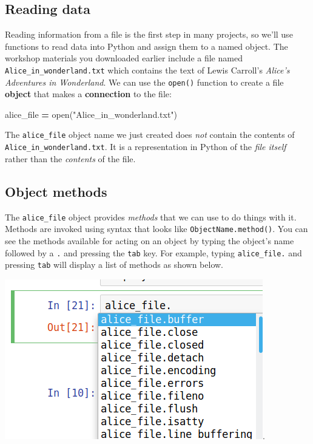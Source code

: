 \documentclass[]{book}
\newenvironment{Shaded}{\begin{snugshade}}{\end{snugshade}}
\newcommand{\BuiltInTok}[1]{#1}
\newcommand{\NormalTok}[1]{#1}
\newcommand{\OperatorTok}[1]{\textcolor[rgb]{0.81,0.36,0.00}{\textbf{#1}}}
\newcommand{\StringTok}[1]{\textcolor[rgb]{0.31,0.60,0.02}{#1}}
\begin{document}
\hypertarget{reading-data-1}{%
\subsection{Reading data}\label{reading-data-1}}

Reading information from a file is the first step in many projects, so we'll use functions to read data into Python and assign them to a named object. The workshop materials you downloaded earlier include a file named \texttt{Alice\_in\_wonderland.txt} which contains the text of Lewis Carroll's \emph{Alice's Adventures in Wonderland}. We can use the \texttt{open()} function to create a file \textbf{object} that makes a \textbf{connection} to the file:

\begin{Shaded}
\begin{Highlighting}[]
\NormalTok{alice_file }\OperatorTok{=} \BuiltInTok{open}\NormalTok{(}\StringTok{"Alice_in_wonderland.txt"}\NormalTok{)}
\end{Highlighting}
\end{Shaded}

The \texttt{alice\_file} object name we just created does \emph{not} contain the contents of \texttt{Alice\_in\_wonderland.txt}. It is a representation in Python of the \emph{file itself} rather than the \emph{contents} of the file.

\hypertarget{object-methods}{%
\subsection{Object methods}\label{object-methods}}

The \texttt{alice\_file} object provides \emph{methods} that we can use to do things with it. Methods are invoked using syntax that looks like \texttt{ObjectName.method()}. You can see the methods available for acting on an object by typing the object's name followed by a \texttt{.} and pressing the \texttt{tab} key. For example, typing \texttt{alice\_file.} and pressing \texttt{tab} will display a list of methods as shown below.

\includegraphics{Python/PythonIntro/images/notebook_file_completion.png}.
\end{document}
